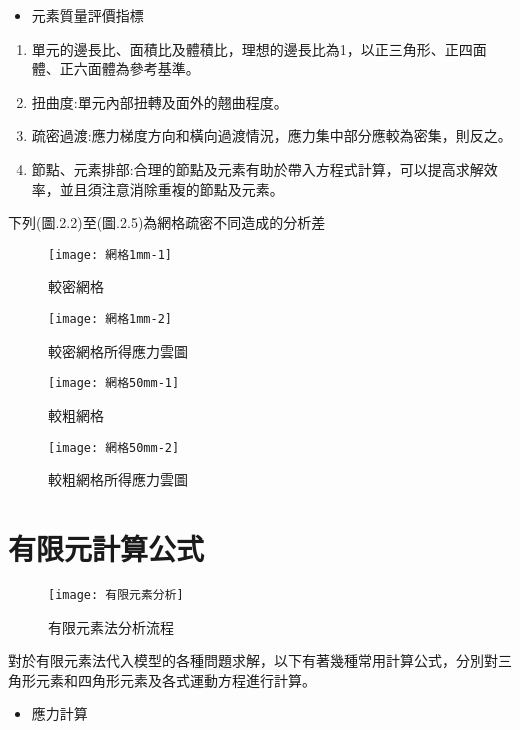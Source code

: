 \begin{itemize}
\item 元素質量評價指標
\end{itemize}

\begin{enumerate}
\item 單元的邊長比、面積比及體積比，理想的邊長比為1，以正三角形、正四面體、正六面體為參考基準。
\item 扭曲度:單元內部扭轉及面外的翹曲程度。
\item 疏密過渡:應力梯度方向和橫向過渡情況，應力集中部分應較為密集，則反之。
\item 節點、元素排部:合理的節點及元素有助於帶入方程式計算，可以提高求解效率，並且須注意消除重複的節點及元素。
\end{enumerate}
下列(圖.2.2)至(圖.2.5)為網格疏密不同造成的分析差\

\begin{figure}[htbp]
  \centering
  \begin{minipage}{0.45\textwidth}
    \centering
    \texttt{[image: 網格1mm-1]}
    \caption{較密網格}
    \label{網格1mm-1}
  \end{minipage}
  \hfill
  \begin{minipage}{0.45\textwidth}
    \centering
    \texttt{[image: 網格1mm-2]}
    \caption{較密網格所得應力雲圖}
    \label{網格1mm-2}
  \end{minipage}
  
  \vspace{0.75cm} %
  
  \begin{minipage}{0.45\textwidth}
    \centering
    \texttt{[image: 網格50mm-1]}
    \caption{較粗網格}
    \label{網格50mm-1}
  \end{minipage}
  \hfill
  \begin{minipage}{0.45\textwidth}
    \centering
    \texttt{[image: 網格50mm-2]}
    \caption{較粗網格所得應力雲圖}
    \label{網格50mm-2}
  \end{minipage}
\end{figure}
\newpage

\section{有限元計算公式}
\begin{figure}[hbt!]
\begin{center}
\texttt{[image: 有限元素分析]}
\caption{\Large 有限元素法分析流程}\label{有限元分析}
\end{center}
\end{figure}
對於有限元素法代入模型的各種問題求解，以下有著幾種常用計算公式，分別對三角形元素和四角形元素及各式運動方程進行計算。
\begin{itemize}
\item 應力計算
\end{itemize}

